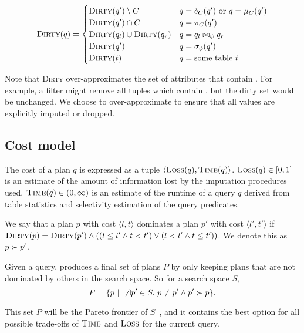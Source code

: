 \begin{align*}
  \textsc{Dirty}(q) = \begin{cases}
    \textsc{Dirty}(q') \setminus C & q = \delta_C(q')\ \text{or}\ q = \mu_C(q') \\
    \textsc{Dirty}(q') \cap C & q = \pi_C(q') \\
    \textsc{Dirty}(q_l) \cup \textsc{Dirty}(q_r) & q = q_l \bowtie_\psi q_r \\
    \textsc{Dirty}(q') & q = \sigma_\phi(q') \\
    \textsc{Dirty}(t) & q = \text{some table}\ t \\
  \end{cases}
\end{align*}

Note that \textsc{Dirty} over-approximates the set of attributes that contain \nullv{}. For example, a filter might remove all tuples which contain \nullv{}, but the dirty set would be unchanged. We choose to over-approximate to ensure that all \nullv{} values are explicitly imputed or dropped.


\subsection{Cost model}
\label{sec:cost-model}
The cost of a plan $q$ is expressed as a tuple $\langle \textsc{Loss}(q), \textsc{Time}(q) \rangle$.
$\textsc{Loss}(q) \in [0,1]$ is an estimate of the amount of information lost by the imputation procedures used.
$\textsc{Time}(q) \in (0, \infty)$ is an estimate of the runtime of a query $q$ derived from table statistics and selectivity estimation of the query predicates. 

\begin{definition}
We say that a plan $p$ with cost $\langle l, t \rangle$ dominates a plan $p'$ with cost $\langle l', t' \rangle$ if $\textsc{Dirty}(p) = \textsc{Dirty}(p') \land ((l \leq l' \land t < t') \lor (l < l' \land t \leq t'))$. We denote this as $p \succ p'$. 
\end{definition}

Given a query, \ProjectName{} produces a final set of plans $P$ by only keeping plans that are not dominated by others in the search space. So for a search space $S$, \[P= \{ p ~|~ \not\exists p' \in S.\ p \neq p' \land p' \succ p \}.\]
 
This set $P$ will be the Pareto frontier of $S$~\cite{pareto1964cours}, and it contains the best option for all possible trade-offs of $\textsc{Time}$ and $\textsc{Loss}$ for the current query.

